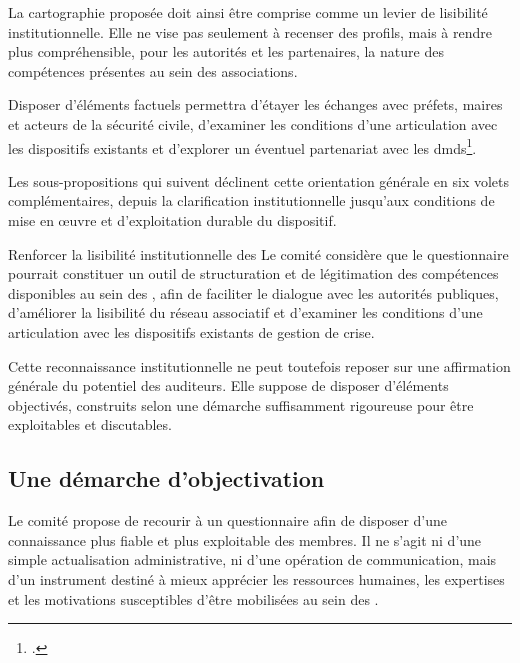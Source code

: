 La cartographie proposée doit ainsi être comprise comme un levier de lisibilité institutionnelle. Elle ne vise pas seulement à recenser des profils, mais à rendre plus compréhensible, pour les autorités et les partenaires, la nature des compétences présentes au sein des associations.

Disposer d'éléments factuels permettra d'étayer les échanges avec préfets, maires et acteurs de la sécurité civile, d'examiner les conditions d'une articulation avec les dispositifs existants et d'explorer un éventuel partenariat avec les \glspl{dmd}\footcite{DMD_def_missions}.


Les sous-propositions qui suivent déclinent cette orientation générale en six volets complémentaires, depuis la clarification institutionnelle jusqu'aux conditions de mise en \oe{}uvre et d'exploitation durable du dispositif.

\begin{subproposition}{Renforcer la lisibilité institutionnelle des \AssociationsUnionIHEDN}
Le comité considère que le questionnaire pourrait constituer un outil de structuration et de légitimation des compétences disponibles au sein des \AssociationsUnionIHEDN, afin de faciliter le dialogue avec les autorités publiques, d'améliorer la lisibilité du réseau associatif et d'examiner les conditions d'une articulation avec les dispositifs existants de gestion de crise.
\end{subproposition}

Cette reconnaissance institutionnelle ne peut toutefois reposer sur une affirmation générale du potentiel des auditeurs. Elle suppose de disposer d'éléments objectivés, construits selon une démarche suffisamment rigoureuse pour être exploitables et discutables.

\subsection{Une démarche d'objectivation}

Le comité propose de recourir à un questionnaire afin de disposer d'une connaissance plus fiable et plus exploitable des membres. Il ne s'agit ni d'une simple actualisation administrative, ni d'une opération de communication, mais d'un instrument destiné à mieux apprécier les ressources humaines, les expertises et les motivations susceptibles d'être mobilisées au sein des \AssociationsUnionIHEDN.

